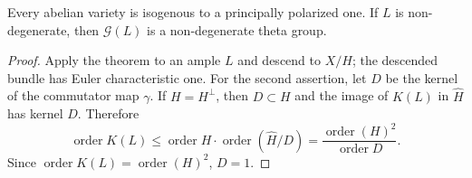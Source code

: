 \begin{corollary}
\label{mumford-cor-principal-polarization-theta}
Every abelian variety is isogenous to a principally polarized one. If $L$ is
non-degenerate, then $\mathcal G(L)$ is a non-degenerate theta group.
\end{corollary}
\begin{proof}
Apply the theorem to an ample $L$ and descend to $X/H$; the descended bundle
has Euler characteristic one. For the second assertion, let $D$ be the
kernel of the commutator map $\gamma$. If $H=H^\perp$, then $D\subset H$ and
the image of $K(L)$ in $\widehat H$ has kernel $D$. Therefore
\[
\operatorname{order}K(L)\leq\operatorname{order}H\cdot
\operatorname{order}(\widehat H/D)=
\frac{\operatorname{order}(H)^2}{\operatorname{order}D}.
\]
Since $\operatorname{order}K(L)=\operatorname{order}(H)^2$, $D=1$.
\end{proof}
